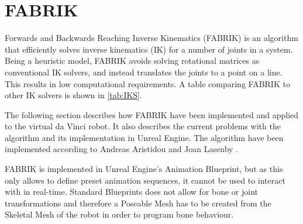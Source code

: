 \chapter{FABRIK}
Forwards and Backwards Reaching Inverse Kinematics (FABRIK) is an algorithm that efficiently solves inverse kinematics (IK) for a number of joints in a system. Being a heuristic model, FABRIK avoids solving rotational matrices as conventional IK solvers, and instead translates the joints to a point on a line. This results in low computational requirements. A table comparing FABRIK to other IK solvers is shown in \autoref{tab:IKS}. 

\begin{table}[H]
	\centering
	
	\caption{Average results from different IK methods for a system with 10 joints \citep{aristidou_fabrik:_2011}}
	\label{tab:IKS}
\end{table}


The following section describes how FABRIK have been implemented and applied to the virtual da Vinci robot. It also describes the current problems with the algorithm and its implementation in Unreal Engine. 
The algorithm have been implemented according to Andreas Aristidou and Joan Lasenby \citep{aristidou_fabrik:_2011}.  %

FABRIK is implemented in Unreal Engine's Animation Blueprint, but as this only allows to define preset animation sequences, it cannot be used to interact with in real-time. Standard Blueprints does not allow for bone or joint transformations and therefore a Poseable Mesh has to be created from the Skeletal Mesh of the robot in order to program bone behaviour. 

